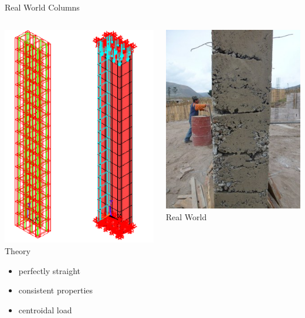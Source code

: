 \documentclass[10pt, svgnames]{beamer}
\begin{document}
\begin{frame}[label={sec:org5baf740}]{Real World Columns}
\begin{columns}
\begin{column}{0.4\columnwidth}
\includegraphics[height=0.5\textheight]{pictures/perfect-column} \\\empty
Theory

\begin{itemize}
\item perfectly straight
\item consistent properties
\item centroidal load
\end{itemize}
\end{column}

\begin{column}{0.4\columnwidth}
\includegraphics[height=0.5\textheight]{pictures/real-world-column} \\\empty
Real World


\end{column}
\end{columns}
\end{frame}
\end{document}
